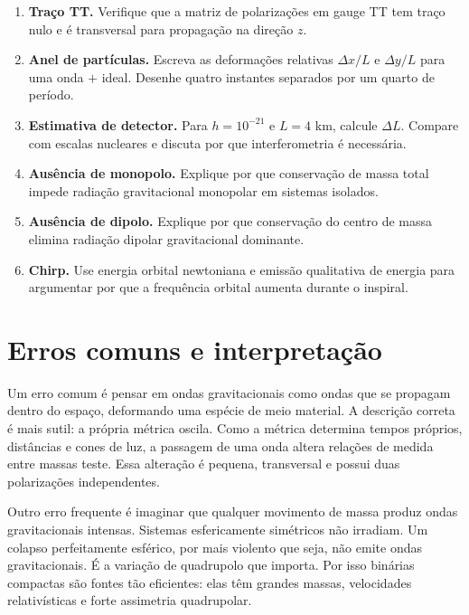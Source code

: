 \documentclass[12pt,a4paper,oneside]{book}
\theoremstyle{rgplain}
\theoremstyle{rgremark}
\begin{document}
\begin{enumerate}
  \item \textbf{Traço TT.} Verifique que a matriz de polarizações em gauge TT
  tem traço nulo e é transversal para propagação na direção $z$.

  \item \textbf{Anel de partículas.} Escreva as deformações relativas
  $\Delta x/L$ e $\Delta y/L$ para uma onda $+$ ideal. Desenhe quatro instantes
  separados por um quarto de período.

  \item \textbf{Estimativa de detector.} Para $h=10^{-21}$ e $L=4$ km, calcule
  $\Delta L$. Compare com escalas nucleares e discuta por que interferometria é
  necessária.

  \item \textbf{Ausência de monopolo.} Explique por que conservação de massa
  total impede radiação gravitacional monopolar em sistemas isolados.

  \item \textbf{Ausência de dipolo.} Explique por que conservação do centro de
  massa elimina radiação dipolar gravitacional dominante.

  \item \textbf{Chirp.} Use energia orbital newtoniana e emissão qualitativa
  de energia para argumentar por que a frequência orbital aumenta durante o
  inspiral.
\end{enumerate}

\section{Erros comuns e interpretação}

Um erro comum é pensar em ondas gravitacionais como ondas que se propagam
dentro do espaço, deformando uma espécie de meio material. A descrição correta
é mais sutil: a própria métrica oscila. Como a métrica determina tempos
próprios, distâncias e cones de luz, a passagem de uma onda altera relações de
medida entre massas teste. Essa alteração é pequena, transversal e possui duas
polarizações independentes.

Outro erro frequente é imaginar que qualquer movimento de massa produz ondas
gravitacionais intensas. Sistemas esfericamente simétricos não irradiam. Um
colapso perfeitamente esférico, por mais violento que seja, não emite ondas
gravitacionais. É a variação de quadrupolo que importa. Por isso binárias
compactas são fontes tão eficientes: elas têm grandes massas, velocidades
relativísticas e forte assimetria quadrupolar.
\end{document}
